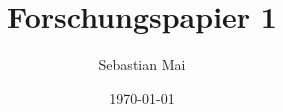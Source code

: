 \documentclass[a4paper,12pt,titlepage]{scrartcl}
\title{Forschungspapier 1}
\subtitle{}
\author{Sebastian Mai}
\date{\today} %
\begin{document}
\maketitle
\tableofcontents



\newpage
\sloppy
\printbibliography
\listoftables
\end{document}

